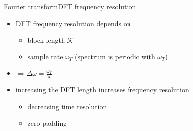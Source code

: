 	\begin{frame}{Fourier transform}{DFT frequency resolution}
        \begin{itemize}
            \item   DFT frequency resolution depends on 
                \begin{itemize}
                    \item   block length $\mathcal{K}$
                    \item   sample rate $\omega_T$ (spectrum is periodic with $\omega_T$)
                \end{itemize}
            \pause
            \item   $\Rightarrow \Delta\omega = \frac{\omega_T}{\mathcal{K}}$
            \pause
            \bigskip
            \item   increasing the DFT length increases frequency resolution
                \begin{itemize}
                    \item   decreasing time resolution
                    \item   zero-padding
                \end{itemize}
        \end{itemize}
	\end{frame}	


